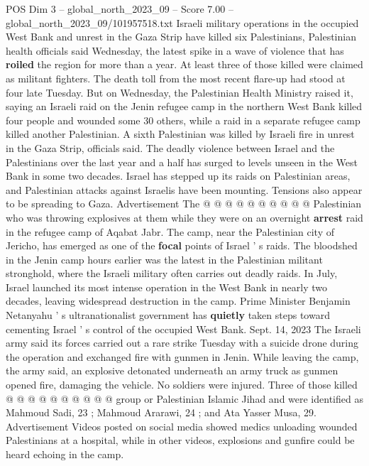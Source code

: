 \begin{textsample}{POS Dim 3 – global\_north\_2023\_09 – Score 7.00 – global\_north\_2023\_09/101957518.txt}  \label{ex:f3_pos_046}
Israeli military operations in the occupied West Bank and unrest in the Gaza Strip have killed six Palestinians, Palestinian health officials said Wednesday, the latest spike in a wave of violence that has \textbf{roiled} the region for more than a year.
At least three of those killed were claimed as militant fighters.
The death toll from the most recent flare-up had stood at four late Tuesday.
But on Wednesday, the Palestinian Health Ministry raised it, saying an Israeli raid on the Jenin refugee camp in the northern West Bank killed four people and wounded some 30 others, while a raid in a separate refugee camp killed another Palestinian.
A sixth Palestinian was killed by Israeli fire in unrest in the Gaza Strip, officials said.
The deadly violence between Israel and the Palestinians over the last year and a half has surged to levels unseen in the West Bank in some two decades.
Israel has stepped up its raids on Palestinian areas, and Palestinian attacks against Israelis have been mounting.
Tensions also appear to be spreading to Gaza.
Advertisement The @ @ @ @ @ @ @ @ @ @ Palestinian who was throwing explosives at them while they were on an overnight \textbf{arrest} raid in the refugee camp of Aqabat Jabr.
The camp, near the Palestinian city of Jericho, has emerged as one of the \textbf{focal} points of Israel ' s raids.
The bloodshed in the Jenin camp hours earlier was the latest in the Palestinian militant stronghold, where the Israeli military often carries out deadly raids.
In July, Israel launched its most intense operation in the West Bank in nearly two decades, leaving widespread destruction in the camp.
Prime Minister Benjamin Netanyahu ' s ultranationalist government has \textbf{quietly} taken steps toward cementing Israel ' s control of the occupied West Bank.
Sept. 14, 2023 The Israeli army said its forces carried out a rare strike Tuesday with a suicide drone during the operation and exchanged fire with gunmen in Jenin.
While leaving the camp, the army said, an explosive detonated underneath an army truck as gunmen opened fire, damaging the vehicle.
No soldiers were injured.
Three of those killed @ @ @ @ @ @ @ @ @ @ group or Palestinian Islamic Jihad and were identified as Mahmoud Sadi, 23 ; Mahmoud Ararawi, 24 ; and Ata Yasser Musa, 29.
Advertisement Videos posted on social media showed medics unloading wounded Palestinians at a hospital, while in other videos, explosions and gunfire could be heard echoing in the camp.

\end{textsample}
